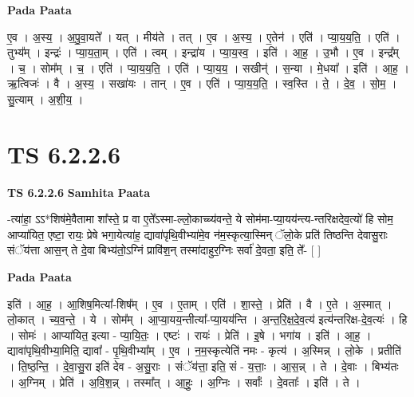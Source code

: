 \documentclass[17pt]{extarticle}
\begin{document}
\textbf{Pada Paata} \newline

ए॒व । अ॒स्य॒ । अ॒पु॒वा॒यते᳚ । यत् । मीय॑ते । तत् । ए॒व । अ॒स्य॒ । ए॒तेन॑ । एति॑ । प्या॒य॒य॒ति॒ । एति॑ । तुभ्य᳚म् । इन्द्रः॑ । प्या॒य॒ता॒म् । एति॑ । त्वम् । इन्द्रा॑य । प्या॒य॒स्व॒ । इति॑ । आ॒ह॒ । उ॒भौ । ए॒व । इन्द्र᳚म् । च॒ । सोम᳚म् । च॒ । एति॑ । प्या॒य॒य॒ति॒ । एति॑ । प्या॒य॒य॒ । सखीन्॑ । स॒न्या । मे॒धया᳚ । इति॑ । आ॒ह॒ । ऋ॒त्विजः॑ । वै । अ॒स्य॒ । सखा॑यः । तान् । ए॒व । एति॑ । प्या॒य॒य॒ति॒ । स्व॒स्ति । ते॒ । दे॒व॒ । सो॒म॒ । सु॒त्याम् । अ॒शी॒य॒ ।  \newline





\section{ TS 6.2.2.6 }

\textbf{TS 6.2.2.6 } \newline
\textbf{Samhita Paata} \newline

-त्या॑हा॒ ऽऽ*शिष॑मे॒वैतामा शा᳚स्ते॒ प्र वा ए॒ते᳚ऽस्मा-ल्लो॒काच्च्य॑वन्ते॒ ये सोम॑मा-प्या॒यय॑न्त्य-न्तरिक्षदेव॒त्यो॑ हि सोम॒ आप्या॑यित॒ एष्टा॒ रायः॒ प्रेषे भगा॒येत्या॑ह॒ द्यावा॑पृथि॒वीभ्या॑मे॒व न॑म॒स्कृत्या॒स्मिन् ॅलो॒के प्रति॑ तिष्ठन्ति देवासु॒राः संॅय॑त्ता आस॒न् ते दे॒वा बिभ्य॑तो॒ऽग्निं प्रावि॑श॒न् तस्मा॑दाहुर॒ग्निः सर्वा॑ दे॒वता॒ इति॒ ते᳚- [  ] \newline

\textbf{Pada Paata} \newline

इति॑ । आ॒ह॒ । आ॒शिष॒मित्या᳚-शिष᳚म् । ए॒व । ए॒ताम् । एति॑ । शा॒स्ते॒ । प्रेति॑ । वै । ए॒ते । अ॒स्मात् । लो॒कात् । च्य॒व॒न्ते॒ । ये । सोम᳚म् । आ॒प्या॒यय॒न्तीत्या᳚-प्या॒यय॑न्ति । अ॒न्त॒रि॒क्ष॒दे॒व॒त्य॑ इत्य॑न्तरिक्ष-दे॒व॒त्यः॑ । हि । सोमः॑ । आप्या॑यित॒ इत्या - प्या॒यि॒तः॒ । एष्टः॑ । रायः॑ । प्रेति॑ । इ॒षे । भगा॑य । इति॑ । आ॒ह॒ । द्यावा॑पृथि॒वीभ्या॒मिति॒ द्यावा᳚ - पृ॒थि॒वीभ्या᳚म् । ए॒व । न॒म॒स्कृत्येति॑ नमः - कृत्य॑ । अ॒स्मिन्न् । लो॒के । प्रतीति॑ । ति॒ष्ठ॒न्ति॒ । दे॒वा॒सु॒रा इति॑ देव - अ॒सु॒राः । संॅय॑त्ता॒ इति॒ सं - य॒त्ताः॒ । आ॒स॒न्न् । ते । दे॒वाः । बिभ्य॑तः । अ॒ग्निम् । प्रेति॑ । अ॒वि॒श॒न्न् । तस्मा᳚त् । आ॒हुः॒ । अ॒ग्निः । सर्वाः᳚ । दे॒वताः᳚ । इति॑ । ते ।  \newline




\end{document}
